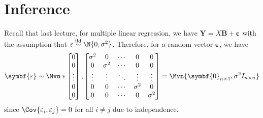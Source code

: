 \section{Inference}
Recall that last lecture, for multiple linear regression,
we have $ \symbf{Y}=X\symbf{B}+\symbf{\varepsilon} $
with the assumption that $ \varepsilon\stackrel{\text{iid}}{\sim}\N{0,\sigma^2} $.
Therefore, for a random vector $ \symbf{\varepsilon} $, we have
\[ \symbf{\varepsilon}\sim\Mvn*{
    \begin{bmatrix}
      0      \\
      0      \\
      \vdots \\
      0      \\
      0
    \end{bmatrix},
    \begin{bmatrix}
      \sigma^2 & 0        & \cdots & 0        & 0        \\
      0        & \sigma^2 & \cdots & 0        & 0        \\
      \vdots   & \vdots   & \ddots & \vdots   & \vdots   \\
      0        & 0        & \cdots & \sigma^2 & 0        \\
      0        & 0        & \cdots & 0        & \sigma^2 \\
    \end{bmatrix}}=
  \Mvn{\symbf{0}_{n\times 1},\sigma^2I_{n\times n}} \]
since $ \Cov{\varepsilon_i,\varepsilon_j}=0 $ for all $ i\ne j $ due to independence.

